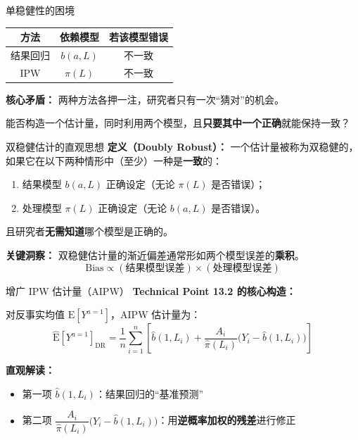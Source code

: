 \documentclass[aspectratio=169,10pt]{beamer}
\newcommand{\E}{\mathrm{E}}
\begin{document}
	\begin{frame}{单稳健性的困境}
		\begin{center}
			\begin{tabular}{ccc}
				\toprule
				\textbf{方法} & \textbf{依赖模型} & \textbf{若该模型错误} \\
				\midrule
				结果回归 & $b(a,L)$ & 不一致 \\
				IPW & $\pi(L)$ & 不一致 \\
				\bottomrule
			\end{tabular}
		\end{center}
		
		\vspace{0.5cm}
		\textbf{核心矛盾：} 两种方法各押一注，研究者只有一次“猜对”的机会。
		
		\vspace{0.5cm}
		 能否构造一个估计量，同时利用两个模型，且\textbf{只要其中一个正确}就能保持一致？
	\end{frame}
	
	\begin{frame}{双稳健估计的直观思想}
		\textbf{定义（Doubly Robust）：}
		一个估计量被称为双稳健的，如果它在以下两种情形中（至少）一种是\textbf{一致}的：
		\begin{enumerate}
			\item 结果模型 $b(a,L)$ 正确设定（无论 $\pi(L)$ 是否错误）；
			\item 处理模型 $\pi(L)$ 正确设定（无论 $b(a,L)$ 是否错误）。
		\end{enumerate}
		且研究者\textbf{无需知道}哪个模型是正确的。
		
		\vspace{0.3cm}
		\textbf{关键洞察：} 双稳健估计量的渐近偏差通常形如两个模型误差的\textbf{乘积}。
		\[
		\text{Bias} \propto (\text{结果模型误差}) \times (\text{处理模型误差})
		\]
	\end{frame}
	
	\begin{frame}{增广 IPW 估计量（AIPW）}
		\textbf{Technical Point 13.2 的核心构造：}
		
		对反事实均值 $\E[Y^{a=1}]$，AIPW 估计量为：
		\[
		\widehat{\E}[Y^{a=1}]_{\text{DR}} = \frac{1}{n}\sum_{i=1}^n \left[ \widehat{b}(1, L_i) + \frac{A_i}{\widehat{\pi}(L_i)}\Big(Y_i - \widehat{b}(1, L_i)\Big) \right]
		\]
		
		\textbf{直观解读：}
		\begin{itemize}
			\item 第一项 $\widehat{b}(1,L_i)$：结果回归的“基准预测”
			\item 第二项 $\dfrac{A_i}{\widehat{\pi}(L_i)}\big(Y_i - \widehat{b}(1,L_i)\big)$：用\textbf{逆概率加权的残差}进行修正
		\end{itemize}
	\end{frame}
	
\end{document}

